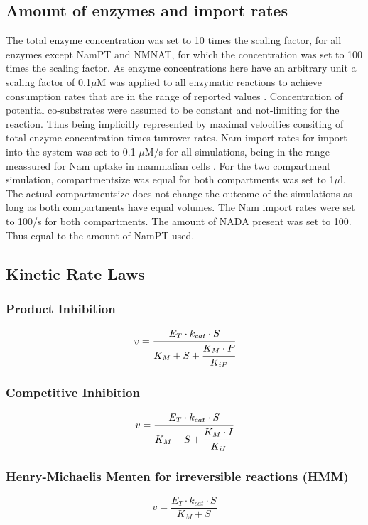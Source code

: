 \documentclass[a4paper,10pt]{article}
\begin{document}
\subsection*{Amount of enzymes and import rates}
The total enzyme concentration was set to 10 times the scaling factor, for all enzymes except NamPT and NMNAT, for which the concentration was set to 100 times the scaling factor. As enzyme concentrations here have an arbitrary unit a scaling factor of 0.1$\mu$M  was applied to all enzymatic reactions to achieve consumption rates that are in the range of reported values  \cite{Liu2018}. Concentration of potential co-substrates were assumed to be constant and not-limiting for the reaction. Thus being implicitly represented by maximal velocities consiting of total enzyme concentration times tunrover rates. Nam import rates for import into the system was set to 0.1 $\mu$M/s for all simulations, being in the range meassured for Nam uptake in mammalian cells \cite{Namuptake}. For the two compartment simulation, compartmentsize was equal for both compartments was set to 1$\mu$l. The actual compartmentsize does not change the outcome of the simulations as long as both compartments have equal volumes. The Nam import rates were set to 100/s for both compartments. The amount of NADA present was set to 100. Thus equal to the amount of NamPT used. 

\subsection*{Kinetic Rate Laws}


\subsubsection*{Product Inhibition}
\begin{equation}
v=\cfrac{E_T\cdot k_{cat}\cdot S}{K_M + S + \cfrac{K_M\cdot P}{K_{iP}} }
\end{equation}

\subsubsection*{Competitive Inhibition}
\begin{equation}
v=\cfrac{E_T\cdot k_{cat}\cdot S}{K_M + S + \cfrac{K_M\cdot I}{K_{iI}} }
\end{equation}


\subsubsection*{Henry-Michaelis Menten for irreversible reactions (HMM)}
\begin{equation}
v=\frac{E_T\cdot k_{cat}\cdot S}{K_M + S}
\end{equation}
\end{document}
